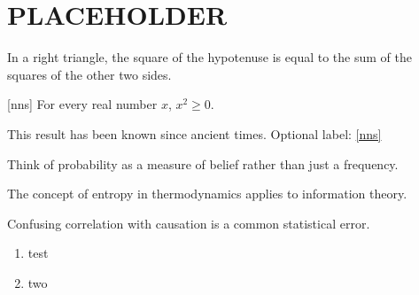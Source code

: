 \chapter{PLACEHOLDER}

\lipsum[1-10]


\begin{theorem} 
    In a right triangle, the square of the hypotenuse is equal to the sum of the squares of the other two sides.
\end{theorem}

\begin{lemma} [nns]
    For every real number $x$, $x^2 \geq 0$.
\end{lemma}

\begin{remark}
    This result has been known since ancient times. Optional label: \ref{nns}
\end{remark}

\begin{intuition}[Probability]
    Think of probability as a measure of belief rather than just a frequency.
\end{intuition}

\begin{wormhole}[Entropy]
    The concept of entropy in thermodynamics applies to information theory.
\end{wormhole}

\begin{fallacy}
    Confusing correlation with causation is a common statistical error.
\end{fallacy}

\begin{enumerate}[label=\Roman*.]
    \item test
    \item two
\end{enumerate}